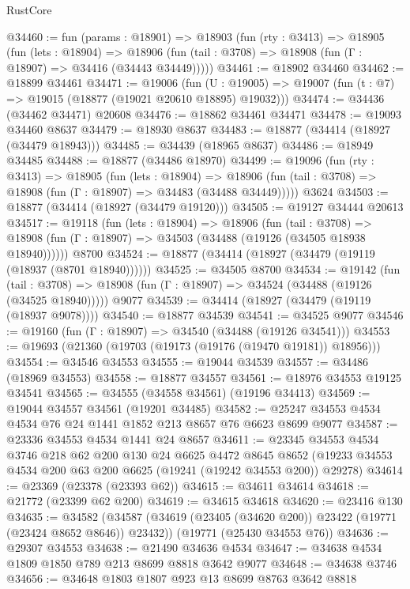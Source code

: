 \begin{lexlean}{RustCore}
\begin{coremodule}
@34460 := fun (params : @18901) =>
  @18903
    (fun (rty : @3413) =>
    @18905
      (fun (lets : @18904) =>
      @18906 (fun (tail : @3708) => @18908 (fun (Γ : @18907) => @34416 (@34443 @34449)))))
@34461 := @18902 @34460
@34462 := @18899 @34461
@34471 := @19006
    (fun (U : @19005) => @19007 (fun (t : @7) => @19015 (@18877 (@19021 @20610 @18895) @19032)))
@34474 := @34436 (@34462 @34471) @20608
@34476 := @18862 @34461 @34471
@34478 := @19093 @34460 @8637
@34479 := @18930 @8637
@34483 := @18877 (@34414 (@18927 (@34479 @18943)))
@34485 := @34439 (@18965 @8637)
@34486 := @18949 @34485
@34488 := @18877 (@34486 @18970)
@34499 := @19096
    (fun (rty : @3413) =>
    @18905
      (fun (lets : @18904) =>
      @18906 (fun (tail : @3708) => @18908 (fun (Γ : @18907) => @34483 (@34488 @34449)))))
    @3624
@34503 := @18877 (@34414 (@18927 (@34479 @19120)))
@34505 := @19127 @34444 @20613
@34517 := @19118
    (fun (lets : @18904) =>
    @18906
      (fun (tail : @3708) =>
      @18908 (fun (Γ : @18907) => @34503 (@34488 (@19126 (@34505 @18938 @18940))))))
    @8700
@34524 := @18877 (@34414 (@18927 (@34479 (@19119 (@18937 (@8701 @18940))))))
@34525 := @34505 @8700
@34534 := @19142
    (fun (tail : @3708) => @18908 (fun (Γ : @18907) => @34524 (@34488 (@19126 (@34525 @18940)))))
    @9077
@34539 := @34414 (@18927 (@34479 (@19119 (@18937 @9078))))
@34540 := @18877 @34539
@34541 := @34525 @9077
@34546 := @19160 (fun (Γ : @18907) => @34540 (@34488 (@19126 @34541)))
@34553 := @19693 (@21360 (@19703 (@19173 (@19176 (@19470 @19181)) @18956)))
@34554 := @34546 @34553
@34555 := @19044 @34539
@34557 := @34486 (@18969 @34553)
@34558 := @18877 @34557
@34561 := @18976 @34553 @19125 @34541
@34565 := @34555 (@34558 @34561) (@19196 @34413)
@34569 := @19044 @34557 @34561 (@19201 @34485)
@34582 := @25247 @34553 @4534 @4534 @76 @24 @1441 @1852 @213 @8657 @76 @6623 @8699 @9077
@34587 := @23336 @34553 @4534 @1441 @24 @8657
@34611 := @23345
    @34553
    @4534
    @3746
    @218
    @62
    @200
    @130
    @24
    @6625
    @4472
    @8645
    @8652
    (@19233 @34553 @4534 @200 @63 @200 @6625 (@19241 (@19242 @34553 @200)) @29278)
@34614 := @23369 (@23378 (@23393 @62))
@34615 := @34611 @34614
@34618 := @21772 (@23399 @62 @200)
@34619 := @34615 @34618
@34620 := @23416 @130
@34635 := @34582
    (@34587 (@34619 (@23405 (@34620 @200)) @23422 (@19771 (@23424 @8652 @8646)) @23432))
    (@19771 (@25430 @34553 @76))
@34636 := @29307 @34553
@34638 := @21490 @34636 @4534
@34647 := @34638 @4534 @1809 @1850 @789 @213 @8699 @8818 @3642 @9077
@34648 := @34638 @3746
@34656 := @34648 @1803 @1807 @923 @13 @8699 @8763 @3642 @8818

\end{coremodule}
\end{lexlean}
